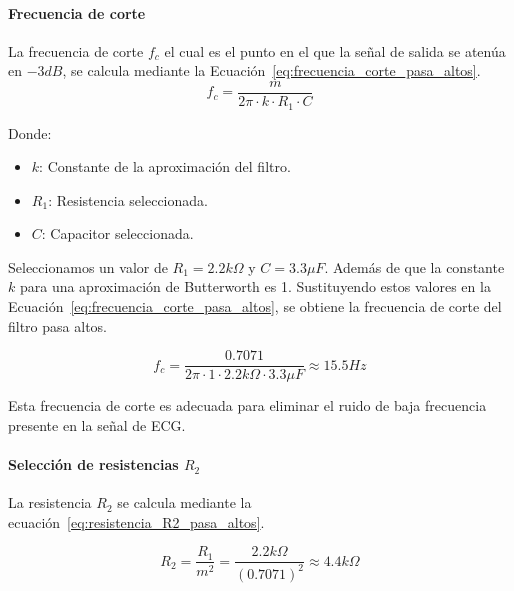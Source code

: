        \paragraph{Frecuencia de corte}
        La frecuencia de corte $f_c$ el cual es el punto en el que la señal de salida se atenúa en $-3 dB$, se calcula mediante la Ecuación~\ref{eq:frecuencia_corte_pasa_altos}.
        \begin{equation}
            \label{eq:frecuencia_corte_pasa_altos}
            f_c = \frac{m}{2\pi \cdot k \cdot R_1 \cdot C}
        \end{equation}

        Donde:

        \begin{itemize}
            \item $k$: Constante de la aproximación del filtro.
            \item $R_1$: Resistencia seleccionada.
            \item $C$: Capacitor seleccionada.
        \end{itemize}

        Seleccionamos un valor de $R_1 = 2.2 k\Omega$ y $C = 3.3 \mu F$. Además de que la constante $k$ para una aproximación de Butterworth es 1. Sustituyendo estos valores en la Ecuación~\ref{eq:frecuencia_corte_pasa_altos}, se obtiene la frecuencia de corte del filtro pasa altos.

        \begin{equation}
            \label{eq:frecuencia_corte_pasa_altos_valor}
            f_c = \frac{0.7071}{2\pi \cdot 1 \cdot 2.2 k\Omega \cdot 3.3 \mu F} \approx 15.5 Hz
        \end{equation}

        Esta frecuencia de corte es adecuada para eliminar el ruido de baja frecuencia presente en la señal de ECG.

        \paragraph{Selección de resistencias $R_2$}
        La resistencia $R_2$ se calcula mediante la ecuación~\ref{eq:resistencia_R2_pasa_altos}.

        \begin{equation}
            \label{eq:resistencia_R2_pasa_altos}
            R_2 = \frac{R_1}{m^2} = \frac{2.2 k\Omega}{(0.7071)^2} \approx 4.4 k\Omega 
        \end{equation}

